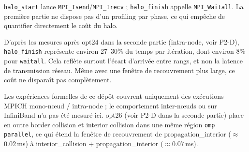 \documentclass[a4paper,11pt,oneside]{report}
\newcommand{\code}[1]{\texttt{#1}}
\begin{document}
\begin{center}
\end{center}

\code{halo\_start} lance \code{MPI\_Isend}/\code{MPI\_Irecv} ; \code{halo\_finish} appelle \code{MPI\_Waitall}. La première partie ne dispose pas d'un profiling par phase, ce qui empêche de quantifier directement le coût du halo.

D'après les mesures après opt24 dans la seconde partie (intra-node, voir P2-D), \code{halo\_finish} représente environ 27--30\% du temps par itération, dont environ 8\% pour \code{waitall}. Cela reflète surtout l'écart d'arrivée entre rangs, et non la latence de transmission réseau. Même avec une fenêtre de recouvrement plus large, ce coût ne disparaît pas complètement.

Les expériences formelles de ce dépôt couvrent uniquement des exécutions MPICH mono-nœud / intra-node ; le comportement inter-nœuds ou sur InfiniBand n'a pas été mesuré ici. opt26 (voir P2-D dans la seconde partie) place en outre border collision et interior collision dans une même région \texttt{omp parallel}, ce qui étend la fenêtre de recouvrement de propagation\_interior ($\approx$0.02\,ms) à interior\_collision + propagation\_interior ($\approx$0.07\,ms).
\end{document}
